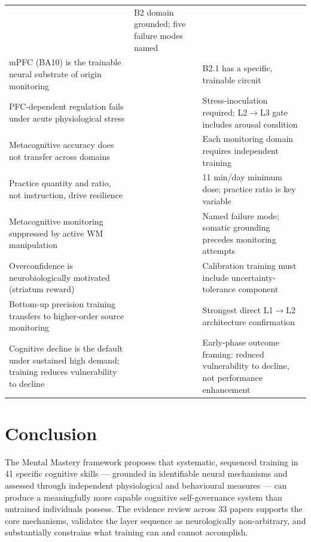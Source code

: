 \documentclass[12pt, a4paper]{article}
\begin{document}
\begin{table}[htbp]
\begin{tabular}{p{5.5cm}p{3.5cm}p{4cm}}
  \citet{johnson1993, mitchell2009, simons2008} & B2 domain grounded; five failure modes named \\
mPFC (BA10) is the trainable neural substrate of origin monitoring &
  \citet{simons2008, subramaniam2012, buda2011} & B2.1 has a specific, trainable circuit \\
PFC-dependent regulation fails under acute physiological stress &
  \citet{raio2013} & Stress-inoculation required; L2$\to$L3 gate includes arousal condition \\
Metacognitive accuracy does not transfer across domains &
  \citet{morales2018, fleming2014} & Each monitoring domain requires independent training \\
Practice quantity and ratio, not instruction, drive resilience &
  \citet{jha2015, jha2016, jha2017, jha2020} & 11 min/day minimum dose; practice ratio is key variable \\
Metacognitive monitoring suppressed by active WM manipulation &
  \citet{maniscalco2015} & Named failure mode; somatic grounding precedes monitoring attempts \\
Overconfidence is neurobiologically motivated (striatum reward) &
  \citet{molenberghs2016} & Calibration training must include uncertainty-tolerance component \\
Bottom-up precision training transfers to higher-order source monitoring &
  \citet{subramaniam2012} & Strongest direct L1$\to$L2 architecture confirmation \\
Cognitive decline is the default under sustained high demand; training reduces vulnerability to decline &
  \citet{jha2017, jha2020} & Early-phase outcome framing: reduced vulnerability to decline, not performance enhancement \\
\bottomrule
\end{tabular}
\end{table}

\section{Conclusion}

The Mental Mastery framework proposes that systematic, sequenced training in 41
specific cognitive skills --- grounded in identifiable neural mechanisms and assessed
through independent physiological and behavioural measures --- can produce a
meaningfully more capable cognitive self-governance system than untrained individuals
possess. The evidence review across 33 papers supports the core mechanisms, validates
the layer sequence as neurologically non-arbitrary, and substantially constrains
what training can and cannot accomplish.
\end{document}
